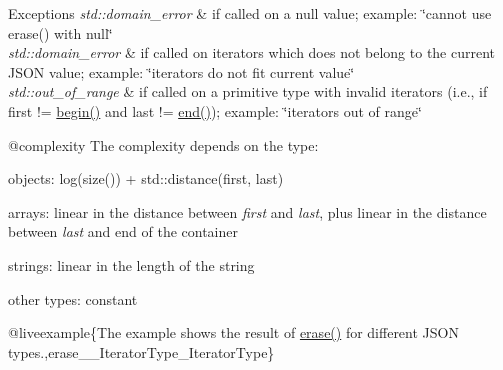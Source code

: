 \begin{DoxyExceptions}{Exceptions}
{\em std\+::domain\+\_\+error} & if called on a {\ttfamily null} value; example\+: {\ttfamily \char`\"{}cannot
use erase() with null\char`\"{}} \\
\hline
{\em std\+::domain\+\_\+error} & if called on iterators which does not belong to the current J\+S\+ON value; example\+: {\ttfamily \char`\"{}iterators do not fit current value\char`\"{}} \\
\hline
{\em std\+::out\+\_\+of\+\_\+range} & if called on a primitive type with invalid iterators (i.\+e., if {\ttfamily first != \mbox{\hyperlink{classnlohmann_1_1basic__json_a0ff28dac23f2bdecee9564d07f51dcdc}{begin()}}} and {\ttfamily last != \mbox{\hyperlink{classnlohmann_1_1basic__json_a13e032a02a7fd8a93fdddc2fcbc4763c}{end()}}}); example\+: {\ttfamily \char`\"{}iterators out of range\char`\"{}}\\
\hline
\end{DoxyExceptions}
@complexity The complexity depends on the type\+:
\begin{DoxyItemize}
\item objects\+: {\ttfamily log(size()) + std\+::distance(first, last)}
\item arrays\+: linear in the distance between {\itshape first} and {\itshape last}, plus linear in the distance between {\itshape last} and end of the container
\item strings\+: linear in the length of the string
\item other types\+: constant
\end{DoxyItemize}

@liveexample\{The example shows the result of {\ttfamily \mbox{\hyperlink{classnlohmann_1_1basic__json_a068a16e76be178e83da6a192916923ed}{erase()}}} for different J\+S\+ON types.,erase\+\_\+\+\_\+\+Iterator\+Type\+\_\+\+Iterator\+Type\}


